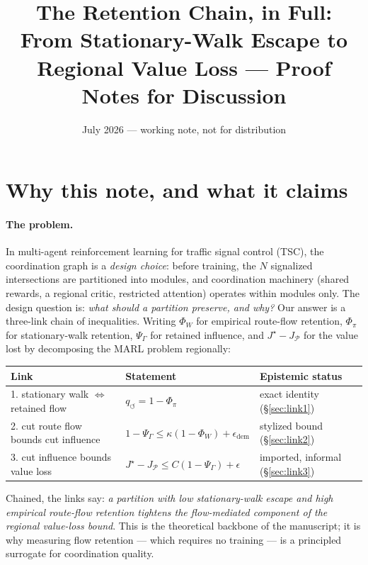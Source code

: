 \documentclass[11pt]{article}
\title{The Retention Chain, in Full:\\
    \large From Stationary-Walk Escape to Regional Value Loss ---
    Proof Notes for Discussion}
\author{}
\date{July 2026 --- working note, not for distribution}
\theoremstyle{definition}
\theoremstyle{remark}
\newcommand{\PsiG}{\Psi_{\Gamma}}
\begin{document}
\maketitle

\section{Why this note, and what it claims}
\label{sec:why}

\paragraph{The problem.}
In multi-agent reinforcement learning for traffic signal control (TSC), the
coordination graph is a \emph{design choice}: before training, the $N$
signalized intersections are partitioned into modules, and coordination
machinery (shared rewards, a regional critic, restricted attention) operates
within modules only.
The design question is: \emph{what should a partition preserve, and why?}
Our answer is a three-link chain of inequalities.
Writing $\Phi_W$ for empirical route-flow retention, $\Phi_\pi$ for
stationary-walk retention, $\PsiG$ for retained influence, and
$J^\star - J_{\mathcal{P}}$ for the value lost by decomposing the MARL
problem regionally:
\begin{center}
    \small
    \begin{tabular}{lll}
        \toprule
        Link                                                        & Statement & Epistemic status \\
        \midrule
        1. stationary walk $\Leftrightarrow$ retained flow          &
        $q_{\circlearrowleft} = 1 - \Phi_\pi$                       &
        exact identity (\S\ref{sec:link1})                         \\
        2. cut route flow bounds cut influence                      &
        $1 - \PsiG \leq \kappa (1 - \Phi_W) + \epsilon_{\mathrm{dem}}$ &
        stylized bound (\S\ref{sec:link2})                         \\
        3. cut influence bounds value loss                          &
        $J^\star - J_{\mathcal{P}} \leq C (1 - \PsiG) + \epsilon$   &
        imported, informal (\S\ref{sec:link3})                     \\
        \bottomrule
    \end{tabular}
\end{center}
Chained, the links say: \emph{a partition with low stationary-walk escape
    and high empirical route-flow retention tightens the flow-mediated
    component of the regional value-loss bound}.
This is the theoretical backbone of the manuscript; it is why measuring flow
retention --- which requires no training --- is a principled surrogate for
coordination quality.
\end{document}
